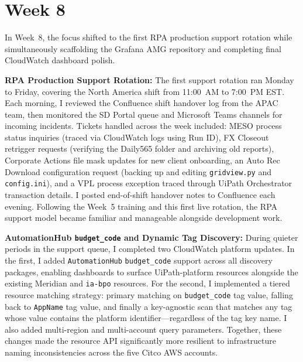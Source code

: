 
\FloatBarrier

\section{Week 8}
\label{sec:week8}

In Week~8, the focus shifted to the first RPA production support
rotation while simultaneously scaffolding the Grafana AMG repository
and completing final CloudWatch dashboard polish.

\textbf{RPA Production Support Rotation:} 
The first
support rotation ran Monday to Friday, covering the North America
shift from 11:00~AM to 7:00~PM EST. Each morning, I reviewed the
Confluence shift handover log from the APAC team, then monitored
the SD Portal queue and Microsoft Teams channels for incoming
incidents. Tickets handled across the week included: MESO process
status inquiries (traced via CloudWatch logs using Run ID),
FX Closeout retrigger requests (verifying the Daily565 folder and
archiving old reports), Corporate Actions file mask updates for
new client onboarding, an Auto Rec Download configuration request
(backing up and editing \texttt{gridview.py} and \texttt{config.ini}),
and a VPL process exception traced through UiPath Orchestrator
transaction details. I posted end-of-shift handover notes to
Confluence each evening. Following the Week~5 training and
this first live rotation, the RPA support model became familiar
and manageable alongside development work.

\textbf{AutomationHub \texttt{budget\_code} and Dynamic Tag Discovery:} 
During quieter periods in the support queue, I completed two
CloudWatch platform updates. In the first, I added \texttt{AutomationHub}
\texttt{budget\_code} support across all discovery packages, enabling
dashboards to surface UiPath-platform resources alongside the existing
Meridian and \texttt{ia-bpo} resources. For the second, I implemented a tiered
resource matching strategy: primary matching on \texttt{budget\_code}
tag value, falling back to \texttt{AppName} tag value, and finally a
key-agnostic scan that matches any tag whose value contains the platform
identifier---regardless of the tag key name. I also added multi-region
and multi-account query parameters. Together, these changes made the
resource API significantly more resilient to infrastructure naming
inconsistencies across the five Citco AWS accounts.

